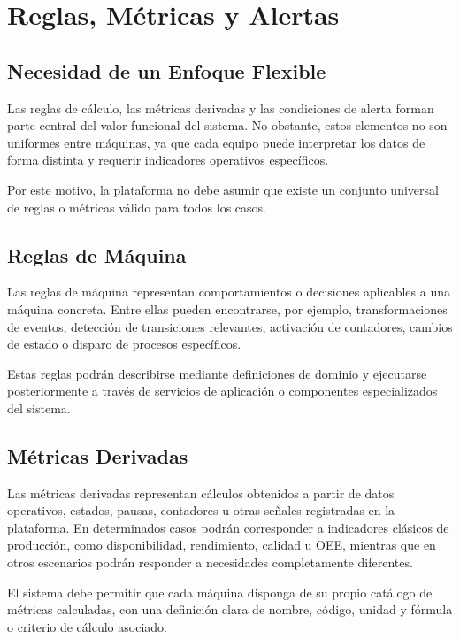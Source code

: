 \section{Reglas, Métricas y Alertas}

\subsection{Necesidad de un Enfoque Flexible}

Las reglas de cálculo, las métricas derivadas y las condiciones de alerta forman parte central del valor funcional del sistema. No obstante, estos elementos no son uniformes entre máquinas, ya que cada equipo puede interpretar los datos de forma distinta y requerir indicadores operativos específicos.

Por este motivo, la plataforma no debe asumir que existe un conjunto universal de reglas o métricas válido para todos los casos.

\subsection{Reglas de Máquina}

Las reglas de máquina representan comportamientos o decisiones aplicables a una máquina concreta. Entre ellas pueden encontrarse, por ejemplo, transformaciones de eventos, detección de transiciones relevantes, activación de contadores, cambios de estado o disparo de procesos específicos.

Estas reglas podrán describirse mediante definiciones de dominio y ejecutarse posteriormente a través de servicios de aplicación o componentes especializados del sistema.

\subsection{Métricas Derivadas}

Las métricas derivadas representan cálculos obtenidos a partir de datos operativos, estados, pausas, contadores u otras señales registradas en la plataforma. En determinados casos podrán corresponder a indicadores clásicos de producción, como disponibilidad, rendimiento, calidad u OEE, mientras que en otros escenarios podrán responder a necesidades completamente diferentes.

El sistema debe permitir que cada máquina disponga de su propio catálogo de métricas calculadas, con una definición clara de nombre, código, unidad y fórmula o criterio de cálculo asociado.

